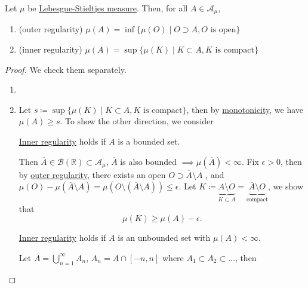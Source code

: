 \begin{theorem}[Regularity]\label{thm:regularity}
	Let \(\mu\) be \hyperref[def:Lebesgue-Stieltjes-measure]{Lebesgue-Stieltjes measure}. Then, for all \(A\in \mathcal{A} _\mu \),
	\begin{enumerate}[(1)]
		\item\label{thm:outer-regularity} (outer regularity) \(\mu (A) = \inf \{\mu (O) \mid O\supset A, O\text{ is open}\}\)
		\item\label{thm:inner-regularity} (inner regularity) \(\mu (A) = \sup \{\mu (K) \mid K\subset A, K\text{ is compact}\}\)
	\end{enumerate}
\end{theorem}
\begin{proof}
	We check them separately.
	\begin{enumerate}[(1)]
		\item {}
		\item Let \(s \coloneqq \sup \{\mu (K) \mid K\subset A, K\text{ is compact} \}\), then by \hyperref[thm:measure-space-monotonicity]{monotonicity}, we have \(\mu (A)\geq s\).
		      To show the other direction, we consider
		      \begin{claim}
			      \hyperref[thm:inner-regularity]{Inner regularity} holds if \(A\) is a bounded set.
		      \end{claim}
		      \begin{explanation}
			      Then \(\overline{A} \in \mathcal{B} (\mathbb{R} )\subset \mathcal{A} _\mu \),
			      \(\overline{A} \) is also bounded \(\implies \mu (\overline{A} ) < \infty \). Fix \(\epsilon >0\), then by \hyperref[thm:outer-regularity]{outer regularity},
			      there exists an open \(O\supset \overline{A} \setminus A\) , and \(\mu (O) - \mu (\overline{A} \setminus A) = \mu (O\setminus (\overline{A} \setminus A))\leq \epsilon \).
			      Let \(K\coloneqq \underbrace{A\setminus O}_{K\subset A} = \underbrace{\overline{A} \setminus O}_{\text{compact}}\), we show that
			      \[
				      \mu (K)\geq \mu (A) - \epsilon .
			      \]
		      \end{explanation}
		      \begin{claim}
			      \hyperref[thm:inner-regularity]{Inner regularity} holds if \(A\) is an unbounded set with \(\mu (A)<\infty \).
		      \end{claim}
		      \begin{explanation}
			      Let \(A = \bigcup\limits_{n=1}^{\infty} A_{n}\), \(A_{n} = A\cap [-n, n]\) where
			      \(A_1\subset A_2\subset \ldots  \), then

\end{explanation}
\end{enumerate}
\end{proof}
